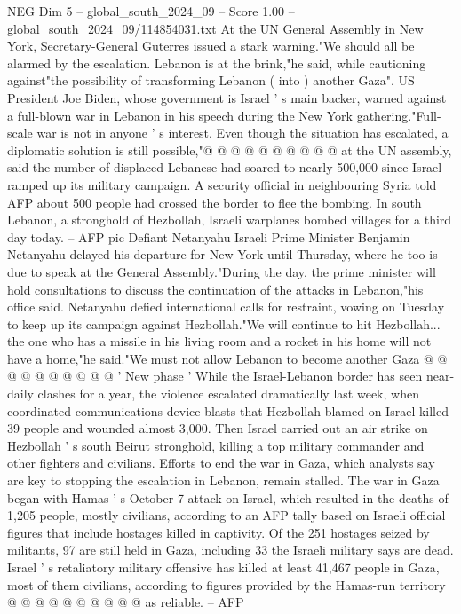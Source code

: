 \begin{textsample}{NEG Dim 5 – global\_south\_2024\_09 – Score 1.00 – global\_south\_2024\_09/114854031.txt}
At the UN General Assembly in New York, Secretary-General Guterres issued a stark warning."We should all be alarmed by the escalation.
Lebanon is at the brink,"he said, while cautioning against"the possibility of transforming Lebanon ( into ) another Gaza".
US President Joe Biden, whose government is Israel ' s main backer, warned against a full-blown war in Lebanon in his speech during the New York gathering."Full-scale war is not in anyone ' s interest.
Even though the situation has escalated, a diplomatic solution is still possible,"@ @ @ @ @ @ @ @ @ @ at the UN assembly, said the number of displaced Lebanese had soared to nearly 500,000 since Israel ramped up its military campaign.
A security official in neighbouring Syria told AFP about 500 people had crossed the border to flee the bombing.
In south Lebanon, a stronghold of Hezbollah, Israeli warplanes bombed villages for a third day today. -- AFP pic Defiant Netanyahu Israeli Prime Minister Benjamin Netanyahu delayed his departure for New York until Thursday, where he too is due to speak at the General Assembly."During the day, the prime minister will hold consultations to discuss the continuation of the attacks in Lebanon,"his office said.
Netanyahu defied international calls for restraint, vowing on Tuesday to keep up its campaign against Hezbollah."We will continue to hit Hezbollah... the one who has a missile in his living room and a rocket in his home will not have a home,"he said."We must not allow Lebanon to become another Gaza @ @ @ @ @ @ @ @ @ @ ' New phase ' While the Israel-Lebanon border has seen near-daily clashes for a year, the violence escalated dramatically last week, when coordinated communications device blasts that Hezbollah blamed on Israel killed 39 people and wounded almost 3,000.
Then Israel carried out an air strike on Hezbollah ' s south Beirut stronghold, killing a top military commander and other fighters and civilians.
Efforts to end the war in Gaza, which analysts say are key to stopping the escalation in Lebanon, remain stalled.
The war in Gaza began with Hamas ' s October 7 attack on Israel, which resulted in the deaths of 1,205 people, mostly civilians, according to an AFP tally based on Israeli official figures that include hostages killed in captivity.
Of the 251 hostages seized by militants, 97 are still held in Gaza, including 33 the Israeli military says are dead.
Israel ' s retaliatory military offensive has killed at least 41,467 people in Gaza, most of them civilians, according to figures provided by the Hamas-run territory @ @ @ @ @ @ @ @ @ @ as reliable. -- AFP

\end{textsample}

